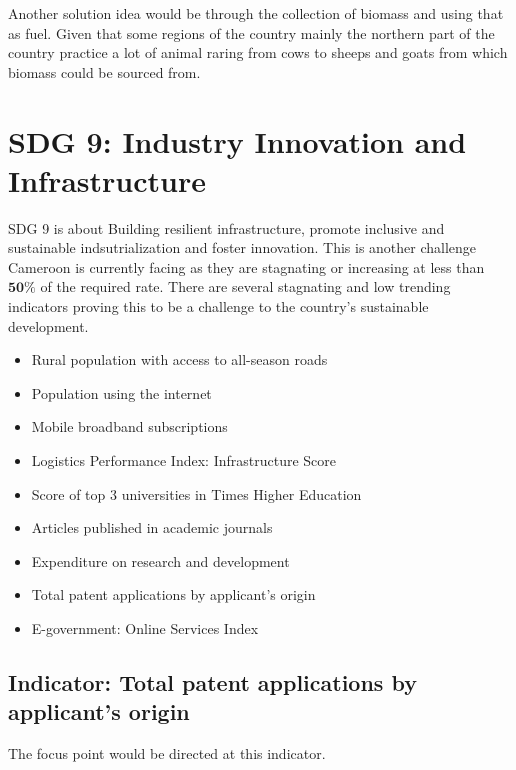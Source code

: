 \documentclass[11pt, a4paper]{article}
\begin{document}
Another solution idea would be through the collection of biomass and using that as fuel.
Given that some regions of the country mainly the northern part of the country practice
a lot of animal raring from cows to sheeps and goats from which biomass could be sourced from.

\section{SDG 9: Industry Innovation and Infrastructure}
SDG 9 is about Building resilient infrastructure, promote inclusive and sustainable
indsutrialization and foster innovation. This is another challenge Cameroon is currently facing as
they are stagnating or increasing at less than $\mathbf{50\%}$ of the required rate.
There are several stagnating and low trending indicators proving this to be a challenge to the
country's sustainable development.

\begin{itemize}
  \item Rural population with access to all-season roads
  \item Population using the internet
  \item Mobile broadband subscriptions
  \item Logistics Performance Index: Infrastructure Score
  \item Score of top 3 universities in Times Higher Education
  \item Articles published in academic journals
  \item Expenditure on research and development
  \item Total patent applications by applicant's origin
  \item E-government: Online Services Index
\end{itemize}

\subsection{Indicator: Total patent applications by applicant's origin}
The focus point would be directed at this indicator.
\end{document}
